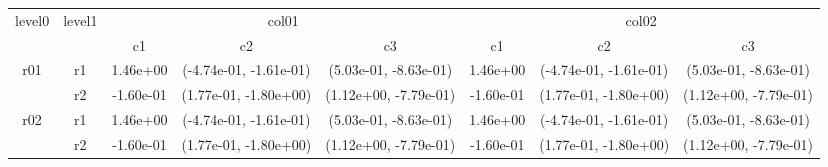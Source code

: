 \begin{tabular}{cccccccc}
\toprule
\multirow{2}{*}{level0} & \multirow{2}{*}{level1}&\multicolumn{3}{c}{col01}&\multicolumn{3}{c}{col02}\tabularnewline
\cmidrule(lr){3-5}
\cmidrule(lr){6-8}
&&c1&c2&c3&c1&c2&c3\tabularnewline
\midrule
\midrule
\multirow{2}{*}{r01}&r1&1.46e+00& (-4.74e-01, -1.61e-01)& (5.03e-01, -8.63e-01)&1.46e+00& (-4.74e-01, -1.61e-01)& (5.03e-01, -8.63e-01)\tabularnewline
&r2&-1.60e-01& (1.77e-01, -1.80e+00)& (1.12e+00, -7.79e-01)&-1.60e-01& (1.77e-01, -1.80e+00)& (1.12e+00, -7.79e-01)\tabularnewline
\midrule
\multirow{2}{*}{r02}&r1&1.46e+00& (-4.74e-01, -1.61e-01)& (5.03e-01, -8.63e-01)&1.46e+00& (-4.74e-01, -1.61e-01)& (5.03e-01, -8.63e-01)\tabularnewline
&r2&-1.60e-01& (1.77e-01, -1.80e+00)& (1.12e+00, -7.79e-01)&-1.60e-01& (1.77e-01, -1.80e+00)& (1.12e+00, -7.79e-01)\tabularnewline
\bottomrule
\end{tabular}
